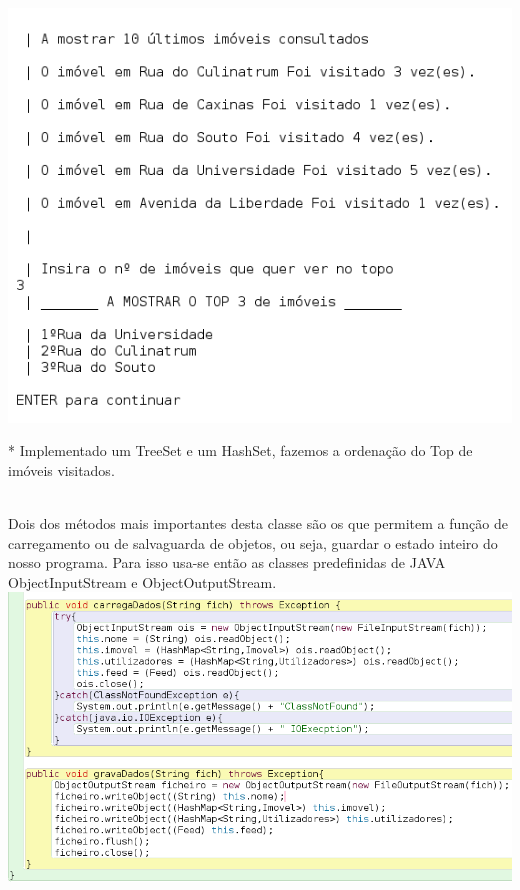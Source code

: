 \documentclass[12pt]{article}
\begin{document}
\includegraphics[scale=0.4]{012.png}

\begin{footnotesize}
* Implementado um TreeSet e um HashSet, fazemos a ordenação do Top de imóveis visitados.
\end{footnotesize}

\pagebreak
~\\

Dois dos métodos mais importantes desta classe são os que permitem a função de carregamento ou de salvaguarda de objetos, ou seja, guardar o estado inteiro do nosso programa.
Para isso usa-se então as classes predefinidas de JAVA ObjectInputStream e ObjectOutputStream. 
~\\

\includegraphics[scale=0.4]{010.png}
\end{document}

